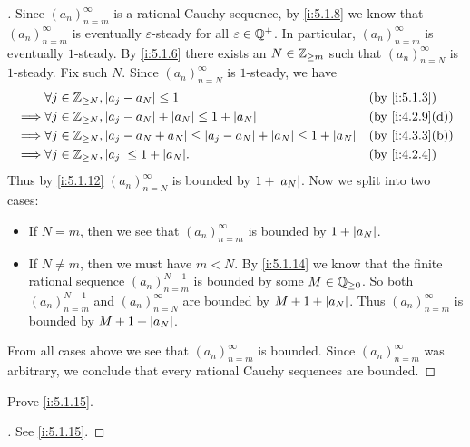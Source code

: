\begin{proof}[]
  Since \((a_n)_{n = m}^{\infty}\) is a rational Cauchy sequence, by \cref{i:5.1.8} we know that \((a_n)_{n = m}^{\infty}\) is eventually \(\varepsilon\)-steady for all \(\varepsilon \in \mathbb{Q}^+\).
  In particular, \((a_n)_{n = m}^{\infty}\) is eventually \(1\)-steady.
  By \cref{i:5.1.6} there exists an \(N \in \mathbb{Z}_{\geq m}\) such that \((a_n)_{n = N}^{\infty}\) is \(1\)-steady.
  Fix such \(N\).
  Since \((a_n)_{n = N}^\infty\) is \(1\)-steady, we have
  \begin{align*}
             & \forall j \in \Z_{\geq N}, \abs{a_j - a_N} \leq 1                                                    &  & \by{i:5.1.3}    \\
    \implies & \forall j \in \Z_{\geq N}, \abs{a_j - a_N} + \abs{a_N} \leq 1 + \abs{a_N}                            &  & \by{i:4.2.9}[d] \\
    \implies & \forall j \in \Z_{\geq N}, \abs{a_j - a_N + a_N} \leq \abs{a_j - a_N} + \abs{a_N} \leq 1 + \abs{a_N} &  & \by{i:4.3.3}[b] \\
    \implies & \forall j \in \Z_{\geq N}, \abs{a_j} \leq 1 + \abs{a_N}.                                             &  & \by{i:4.2.4}
  \end{align*}
  Thus by \cref{i:5.1.12} \((a_n)_{n = N}^\infty\) is bounded by \(1 + \left\lvert a_N\right\rvert\).
  Now we split into two cases:
  \begin{itemize}
    \item If \(N = m\), then we see that \((a_n)_{n = m}^\infty\) is bounded by \(1 + \left\lvert a_N\right\rvert\).
    \item If \(N \neq m\), then we must have \(m < N\).
          By \cref{i:5.1.14} we know that the finite rational sequence \((a_n)_{n = m}^{N - 1}\) is bounded by some \(M \in \mathbb{Q}_{\geq 0}\).
          So both \((a_n)_{n = m}^{N - 1}\) and \((a_n)_{n = N}^\infty\) are bounded by \(M + 1 + \left\lvert a_N\right\rvert\).
          Thus \((a_n)_{n = m}^\infty\) is bounded by \(M + 1 + \left\lvert a_N\right\rvert\).
  \end{itemize}
  From all cases above we see that \((a_n)_{n = m}^\infty\) is bounded.
  Since \((a_n)_{n = m}^\infty\) was arbitrary, we conclude that every rational Cauchy sequences are bounded.
\end{proof}

\exercisesection

\begin{ex}\label{i:ex:5.1.1}
  Prove \cref{i:5.1.15}.
\end{ex}

\begin{proof}[]
  See \cref{i:5.1.15}.
\end{proof}
